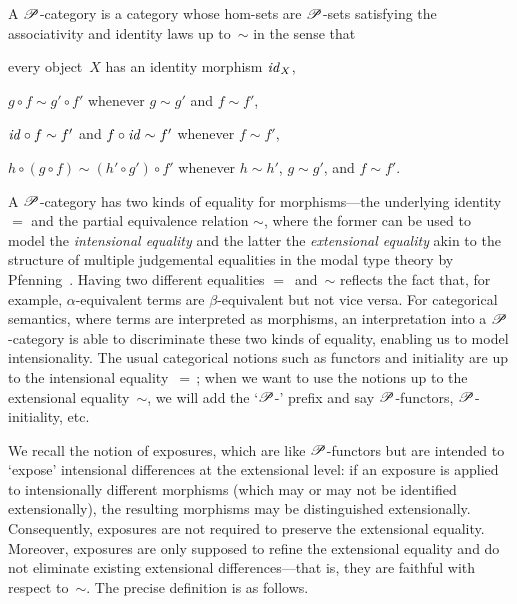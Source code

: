 \documentclass[draft,a4paper,UKenglish,numberwithinsect,cleveref,thm-restate]{lipics-v2021}
\numberwithin{equation}{section}
\theoremstyle{definition}
\theoremstyle{plain}
\begin{document}
\begin{definition}
  A $\mathscr{P}$-category is a category whose hom-sets are $\mathscr{P}$-sets satisfying the associativity and identity laws up to~$\sim$ in the sense that 
  \begin{romanenumerate}
  \item every object~$X$ has an identity morphism $\mathit{id}_X$, 
  \item $g \circ f \sim g' \circ f'$ whenever $g\sim g'$ and $f \sim f'$,
  \item $\mathit{id} \circ f \sim f'$ and $f \circ \mathit{id} \sim f'$ whenever $f \sim f'$,
  \item $h \circ (g \circ f) \sim (h' \circ g') \circ f'$ whenever $h\sim h'$, $g \sim g'$, and $f \sim f'$.
  \end{romanenumerate}
\end{definition}

A $\mathscr{P}$-category has two kinds of equality for morphisms---the underlying identity $=$ and the partial equivalence relation $\sim$, where the former can be used to model the \emph{intensional equality} and the latter the \emph{extensional equality} akin to the structure of multiple judgemental equalities in the modal type theory by Pfenning~\cite{Pfenning2002a}.
Having two different equalities $=$~and~$\sim$ reflects the fact that, for example, $\alpha$-equivalent terms are $\beta$-equivalent but not vice versa.
For categorical semantics, where terms are interpreted as morphisms, an interpretation into a $\mathscr{P}$-category is able to discriminate these two kinds of equality, enabling us to model intensionality.
The usual categorical notions such as functors and initiality are up to the intensional equality~$=$\,; when we want to use the notions up to the extensional equality~$\sim$, we will add the `$\mathscr{P}$-' prefix and say $\mathscr{P}$-functors, $\mathscr{P}$-initiality, etc.

We recall the notion of exposures, which are like $\mathscr{P}$-functors but are intended to `expose' intensional differences at the extensional level: if an exposure is applied to intensionally different morphisms (which may or may not be identified extensionally), the resulting morphisms may be distinguished extensionally.
Consequently, exposures are not required to preserve the extensional equality.
Moreover, exposures are only supposed to refine the extensional equality and do not eliminate existing extensional differences---that is, they are faithful with respect to~$\sim$.
The precise definition is as follows.
\end{document}
